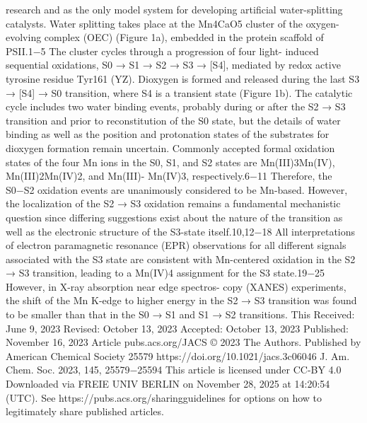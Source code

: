 \documentclass{article}
\begin{document}
research and as the only model system for developing artificial
water-splitting catalysts. Water splitting takes place at the
Mn4CaO5 cluster of the oxygen-evolving complex (OEC)
(Figure 1a), embedded in the protein scaffold of PSII.1−5
The cluster cycles through a progression of four light-
induced sequential oxidations, S0 → S1 → S2 → S3 → [S4],
mediated by redox active tyrosine residue Tyr161 (YZ).
Dioxygen is formed and released during the last S3 → [S4] →
S0 transition, where S4 is a transient state (Figure 1b). The
catalytic cycle includes two water binding events, probably
during or after the S2 → S3 transition and prior to
reconstitution of the S0 state, but the details of water binding
as well as the position and protonation states of the substrates
for dioxygen formation remain uncertain. Commonly accepted
formal oxidation states of the four Mn ions in the S0, S1, and S2
states are Mn(III)3Mn(IV), Mn(III)2Mn(IV)2, and Mn(III)-
Mn(IV)3, respectively.6−11 Therefore, the S0−S2 oxidation
events are unanimously considered to be Mn-based. However,
the localization of the S2 → S3 oxidation remains a
fundamental mechanistic question since differing suggestions
exist about the nature of the transition as well as the electronic
structure of the S3-state itself.10,12−18
All interpretations of electron paramagnetic resonance
(EPR) observations for all different signals associated with
the S3 state are consistent with Mn-centered oxidation in the S2
→ S3 transition, leading to a Mn(IV)4 assignment for the S3
state.19−25 However, in X-ray absorption near edge spectros-
copy (XANES) experiments, the shift of the Mn K-edge to
higher energy in the S2 → S3 transition was found to be smaller
than that in the S0 → S1 and S1 → S2 transitions. This
Received:
June 9, 2023
Revised:
October 13, 2023
Accepted:
October 13, 2023
Published: November 16, 2023
Article
pubs.acs.org/JACS
© 2023 The Authors. Published by
American Chemical Society
25579
https://doi.org/10.1021/jacs.3c06046
J. Am. Chem. Soc. 2023, 145, 25579−25594
This article is licensed under CC-BY 4.0
Downloaded via FREIE UNIV BERLIN on November 28, 2025 at 14:20:54 (UTC).
See https://pubs.acs.org/sharingguidelines for options on how to legitimately share published articles.

\newpage

\end{document}
